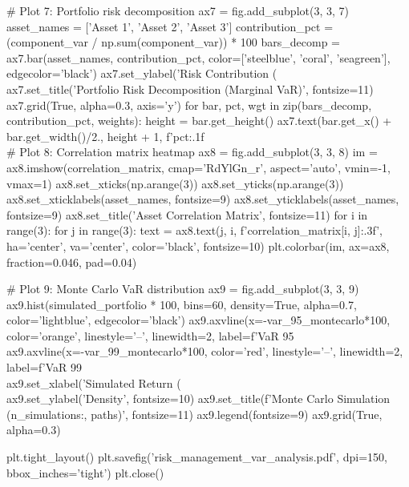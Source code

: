 \documentclass[11pt,a4paper]{article}
\begin{document}
\begin{pycode}
# Plot 7: Portfolio risk decomposition
ax7 = fig.add_subplot(3, 3, 7)
asset_names = ['Asset 1', 'Asset 2', 'Asset 3']
contribution_pct = (component_var / np.sum(component_var)) * 100
bars_decomp = ax7.bar(asset_names, contribution_pct, color=['steelblue', 'coral', 'seagreen'], edgecolor='black')
ax7.set_ylabel('Risk Contribution (\\%
ax7.set_title('Portfolio Risk Decomposition (Marginal VaR)', fontsize=11)
ax7.grid(True, alpha=0.3, axis='y')
for bar, pct, wgt in zip(bars_decomp, contribution_pct, weights):
    height = bar.get_height()
    ax7.text(bar.get_x() + bar.get_width()/2., height + 1, f'{pct:.1f}\\%

# Plot 8: Correlation matrix heatmap
ax8 = fig.add_subplot(3, 3, 8)
im = ax8.imshow(correlation_matrix, cmap='RdYlGn_r', aspect='auto', vmin=-1, vmax=1)
ax8.set_xticks(np.arange(3))
ax8.set_yticks(np.arange(3))
ax8.set_xticklabels(asset_names, fontsize=9)
ax8.set_yticklabels(asset_names, fontsize=9)
ax8.set_title('Asset Correlation Matrix', fontsize=11)
for i in range(3):
    for j in range(3):
        text = ax8.text(j, i, f'{correlation_matrix[i, j]:.3f}', ha='center', va='center', color='black', fontsize=10)
plt.colorbar(im, ax=ax8, fraction=0.046, pad=0.04)

# Plot 9: Monte Carlo VaR distribution
ax9 = fig.add_subplot(3, 3, 9)
ax9.hist(simulated_portfolio * 100, bins=60, density=True, alpha=0.7, color='lightblue', edgecolor='black')
ax9.axvline(x=-var_95_montecarlo*100, color='orange', linestyle='--', linewidth=2, label=f'VaR 95\\%
ax9.axvline(x=-var_99_montecarlo*100, color='red', linestyle='--', linewidth=2, label=f'VaR 99\\%
ax9.set_xlabel('Simulated Return (\\%
ax9.set_ylabel('Density', fontsize=10)
ax9.set_title(f'Monte Carlo Simulation ({n_simulations:,} paths)', fontsize=11)
ax9.legend(fontsize=9)
ax9.grid(True, alpha=0.3)

plt.tight_layout()
plt.savefig('risk_management_var_analysis.pdf', dpi=150, bbox_inches='tight')
plt.close()
\end{pycode}
\end{document}
